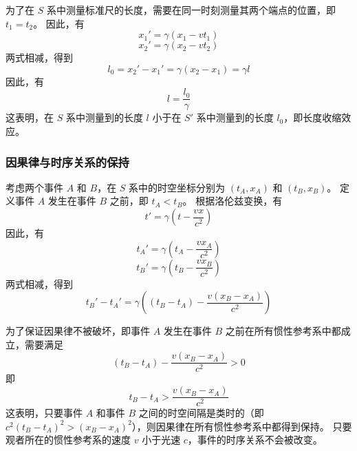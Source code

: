 为了在 $S$ 系中测量标准尺的长度，需要在同一时刻测量其两个端点的位置，即 $t_1 = t_2$。
因此，有
\begin{equation}
    x_1' = \gamma (x_1 - v t_1)
\end{equation}
\begin{equation}
    x_2' = \gamma (x_2 - v t_2)
\end{equation}
两式相减，得到
\begin{equation}
    l_0 = x_2' - x_1' = \gamma (x_2 - x_1) = \gamma l
\end{equation}
因此，有
\begin{equation}
    l = \frac{l_0}{\gamma}
\end{equation}
这表明，在 $S$ 系中测量到的长度 $l$ 小于在 $S'$ 系中测量到的长度 $l_0$，即长度收缩效应。

\subsubsection{因果律与时序关系的保持}

考虑两个事件 $A$ 和 $B$，在 $S$ 系中的时空坐标分别为 $(t_A, x_A)$ 和 $(t_B, x_B)$。
定义事件 $A$ 发生在事件 $B$ 之前，即 $t_A < t_B$。
根据洛伦兹变换，有
\begin{equation}
    t' = \gamma \left(t - \frac{v x}{c^2}\right)
\end{equation}
因此，有
\begin{equation}
    t_A' = \gamma \left(t_A - \frac{v x_A}{c^2}\right)
\end{equation}
\begin{equation}
    t_B' = \gamma \left(t_B - \frac{v x_B}{c^2}\right)
\end{equation}
两式相减，得到
\begin{equation}
    t_B' - t_A' = \gamma \left((t_B - t_A) - \frac{v (x_B - x_A)}{c^2}\right)
\end{equation}

为了保证因果律不被破坏，即事件 $A$ 发生在事件 $B$ 之前在所有惯性参考系中都成立，需要满足
\begin{equation}
    (t_B - t_A) - \frac{v (x_B - x_A)}{c^2} > 0
\end{equation}
即
\begin{equation}
    t_B - t_A > \frac{v (x_B - x_A)}{c^2}
\end{equation}
这表明，只要事件 $A$ 和事件 $B$ 之间的时空间隔是类时的（即 $c^2 (t_B - t_A)^2 > (x_B - x_A)^2$），则因果律在所有惯性参考系中都得到保持。
只要观者所在的惯性参考系的速度 $v$ 小于光速 $c$，事件的时序关系不会被改变。

